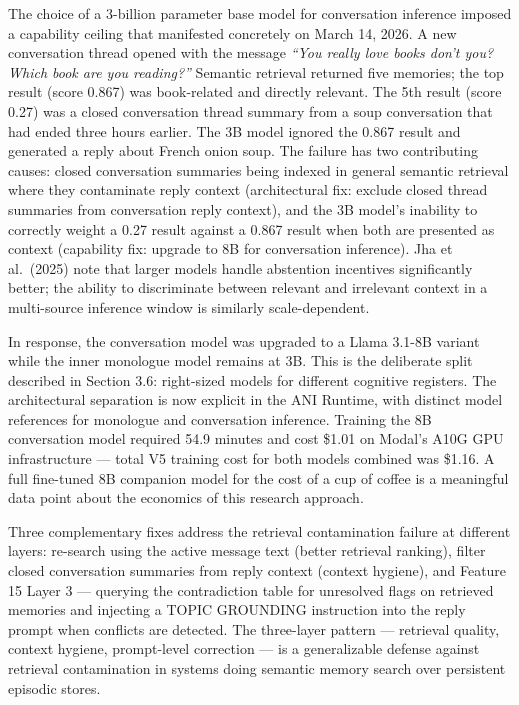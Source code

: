 The choice of a 3-billion parameter base model for conversation
inference imposed a capability ceiling that manifested concretely on
March 14, 2026. A new conversation thread opened with the message
\emph{``You really love books don't you? Which book are you reading?''}
Semantic retrieval returned five memories; the top result (score 0.867)
was book-related and directly relevant. The 5th result (score 0.27) was
a closed conversation thread summary from a soup conversation that had
ended three hours earlier. The 3B model ignored the 0.867 result and
generated a reply about French onion soup. The failure has two
contributing causes: closed conversation summaries being indexed in
general semantic retrieval where they contaminate reply context
(architectural fix: exclude closed thread summaries from conversation
reply context), and the 3B model's inability to correctly weight a 0.27
result against a 0.867 result when both are presented as context
(capability fix: upgrade to 8B for conversation inference). Jha et
al.~(2025) note that larger models handle abstention incentives
significantly better; the ability to discriminate between relevant and
irrelevant context in a multi-source inference window is similarly
scale-dependent.

In response, the conversation model was upgraded to a Llama 3.1-8B
variant while the inner monologue model remains at 3B. This is the
deliberate split described in Section 3.6: right-sized models for
different cognitive registers. The architectural separation is now
explicit in the ANI Runtime, with distinct model references for
monologue and conversation inference. Training the 8B conversation model
required 54.9 minutes and cost \$1.01 on Modal's A10G GPU infrastructure
--- total V5 training cost for both models combined was \$1.16. A full
fine-tuned 8B companion model for the cost of a cup of coffee is a
meaningful data point about the economics of this research approach.

Three complementary fixes address the retrieval contamination failure at
different layers: re-search using the active message text (better
retrieval ranking), filter closed conversation summaries from reply
context (context hygiene), and Feature 15 Layer 3 --- querying the
contradiction table for unresolved flags on retrieved memories and
injecting a TOPIC GROUNDING instruction into the reply prompt when
conflicts are detected. The three-layer pattern --- retrieval quality,
context hygiene, prompt-level correction --- is a generalizable defense
against retrieval contamination in systems doing semantic memory search
over persistent episodic stores.

